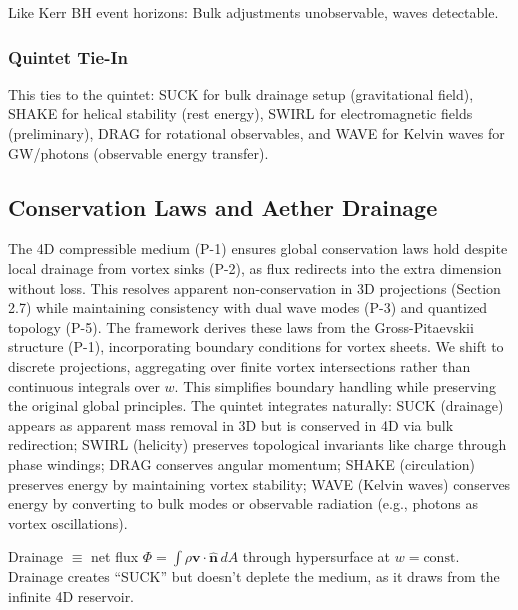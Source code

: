 Like Kerr BH event horizons: Bulk adjustments unobservable, waves detectable.

\subsubsection{Quintet Tie-In}

This ties to the quintet: SUCK for bulk drainage setup (gravitational field), SHAKE for helical stability (rest energy), SWIRL for electromagnetic fields (preliminary), DRAG for rotational observables, and WAVE for Kelvin waves for GW/photons (observable energy transfer).


\subsection{Conservation Laws and Aether Drainage}

The 4D compressible medium (P-1) ensures global conservation laws hold despite local drainage from vortex sinks (P-2), as flux redirects into the extra dimension without loss. This resolves apparent non-conservation in 3D projections (Section 2.7) while maintaining consistency with dual wave modes (P-3) and quantized topology (P-5). The framework derives these laws from the Gross-Pitaevskii structure (P-1), incorporating boundary conditions for vortex sheets. We shift to discrete projections, aggregating over finite vortex intersections rather than continuous integrals over $w$. This simplifies boundary handling while preserving the original global principles. The quintet integrates naturally: SUCK (drainage) appears as apparent mass removal in 3D but is conserved in 4D via bulk redirection; SWIRL (helicity) preserves topological invariants like charge through phase windings; DRAG conserves angular momentum; SHAKE (circulation) preserves energy by maintaining vortex stability; WAVE (Kelvin waves) conserves energy by converting to bulk modes or observable radiation (e.g., photons as vortex oscillations).

Drainage $\equiv$ net flux $\Phi = \int \rho \mathbf{v} \cdot \hat{\mathbf{n}} \, dA$ through hypersurface at $w = \text{const}$. Drainage creates ``SUCK'' but doesn't deplete the medium, as it draws from the infinite 4D reservoir.

